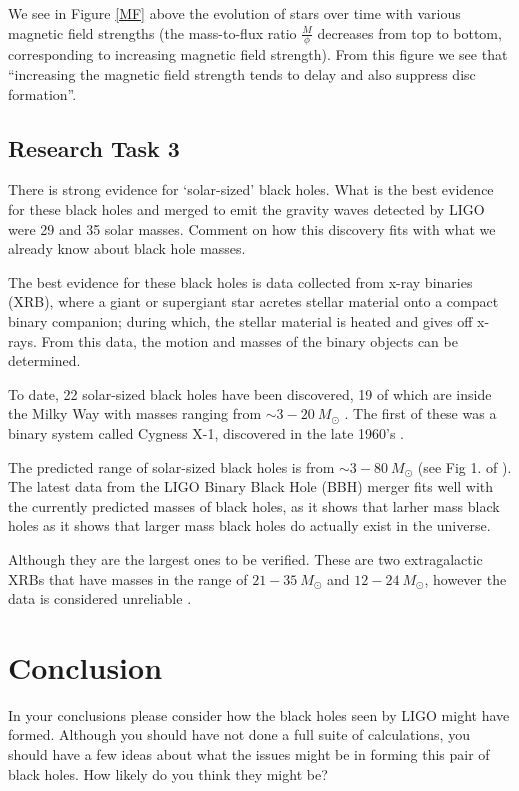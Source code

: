 \documentclass[a4paper]{article} %
\newcommand{\ms}[1]{\SI{#1}{M_{\odot}}}
\begin{document}
We see in Figure \ref{MF} above the evolution of stars over time with various magnetic field strengths (the mass-to-flux ratio $\frac{M}{\phi}$ decreases from top to bottom, corresponding to increasing magnetic field strength). From this figure we see that ``increasing the magnetic field strength tends to delay and also suppress disc formation''\cite{PriceAndBate}.



\pagebreak

\subsection{Research Task 3}
\begin{framed}
There is strong evidence for `solar-sized' black holes. What is the best evidence for these black holes and merged to emit the gravity waves detected by LIGO were 29 and 35 solar masses. Comment on how this discovery fits with what we already know about black hole masses.
\end{framed}

The best evidence for these black holes is data collected from x-ray binaries \cite{Casares} (XRB), where a giant or supergiant star acretes stellar material onto a compact binary companion; during which, the stellar material is heated and gives off x-rays. From this data, the motion and masses of the binary objects can be determined.

To date, 22 solar-sized black holes have been discovered, 19 of which are inside the Milky Way with masses ranging from $\sim 3 - \ms{20}$ \cite{Abbot}. The first of these was a binary system called Cygness X-1, discovered in the late 1960's  \cite{Casares}.

The predicted range of solar-sized black holes is from $\sim 3 - \ms{80}$ (see Fig 1. of \cite{Abbot}). The latest data from the LIGO Binary Black Hole (BBH) merger fits well with the currently predicted masses of black holes, as it shows that larher mass black holes as it shows that larger mass black holes do actually exist in the universe.

Although they are the largest ones to be verified. These are two extragalactic XRBs that have masses in the range of $21 - \ms{35}$ and $12 - \ms{24}$, however the data is considered unreliable \cite{Abbot}.

\pagebreak

\section{Conclusion}
\begin{framed}
In your conclusions please consider how the black holes seen by LIGO might have formed. Although you should have not done a full suite of calculations, you should have a few ideas about what the issues might be in forming this pair of black holes. How likely do you think they might be?
\end{framed}
\end{document}
